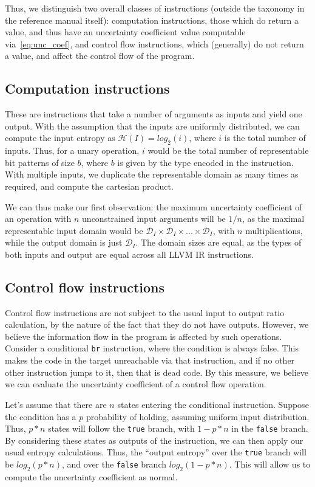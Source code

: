\documentclass[a4paper]{article}
\newcommand{\entropy}[1]{\mathcal{H}(#1)}
\newcommand{\inst}[1]{\texttt{#1}}
\newcommand{\cmnt}[2]{{\color{red}{\textbf{#1:} #2}}}
\newcommand{\AL}[1]{\cmnt{AL}{#1}}
\begin{document}
Thus, we distinguish two overall classes of instructions (outside the taxonomy
in the reference manual itself): computation instructions, those which do
return a value, and thus have an uncertainty coefficient value computable
via~\autoref{eq:unc_coef}, and control flow instructions, which (generally) do
not return a value, and affect the control flow of the program.

\subsection{Computation instructions}\label{sec:comp_inst}
These are instructions that take a number of arguments as inputs and yield one
output. With the assumption that the inputs are uniformly distributed, we can
compute the input entropy as \(\entropy{I} = log_2(i)\), where \(i\) is the
total number of inputs. Thus, for a unary operation, \(i\) would be the total
number of representable bit patterns of size \(b\), where \(b\) is given by the
type encoded in the instruction. With multiple inputs, we duplicate the
representable domain as many times as required, and compute the cartesian
product.

We can thus make our first observation: the maximum uncertainty coefficient of
an operation with \(n\) unconstrained input arguments will be \(1/n\), as the
maximal representable input domain would be \(\mathcal{D}_I \times
\mathcal{D}_I \times ... \times \mathcal{D}_I\), with \(n\) multiplications,
while the output domain is just \(\mathcal{D}_I\). The domain sizes are equal,
as the types of both inputs and output are equal across all LLVM IR
instructions. \AL{Double check}

\subsection{Control flow instructions}
Control flow instructions are not subject to the usual input to output ratio
calculation, by the nature of the fact that they do not have outputs. However,
we believe the information flow in the program is affected by such operations.
Consider a conditional \inst{br} instruction, where the condition is always
false. This makes the code in the target unreachable via that instruction, and
if no other other instruction jumps to it, then that is dead code. By this
measure, we believe we can evaluate the uncertainty coefficient of a control
flow operation.

Let's assume that there are \(n\) states entering the conditional instruction.
Suppose the condition has a \(p\) probability of holding, assuming uniform
input distribution. Thus, \(p*n\) states will follow the \texttt{true} branch,
with \(1-p*n\) in the \texttt{false} branch. By considering these states as
outputs of the instruction, we can then apply our usual entropy calculations.
Thus, the ``output entropy'' over the \texttt{true} branch will be
\(log_2(p*n)\), and over the \texttt{false} branch \(log_2(1-p*n)\). This will
allow us to compute the uncertainty coefficient as normal.
\end{document}
